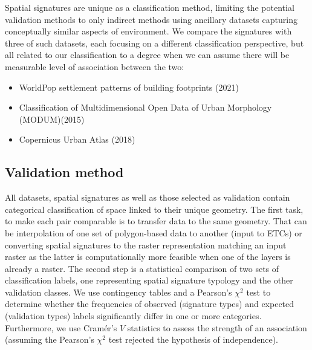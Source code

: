 Spatial signatures are unique as a classification method, limiting the potential
validation methods to only indirect methods using ancillary datasets capturing
conceptually similar aspects of environment. We compare the signatures with three of
such datasets, each focusing on a different classification perspective, but all related
to our classification to a degree when we can assume there will be measurable level of
association between the two:

\begin{itemize}
    \item WorldPop settlement patterns of building footprints (2021)
    \item Classification of Multidimensional Open Data of Urban Morphology (MODUM)(2015)
    \item Copernicus Urban Atlas (2018)
\end{itemize}


\subsection*{Validation method}
All datasets, spatial signatures as well as those selected as validation contain
categorical classification of space linked to their unique geometry. The first task, to
make each pair comparable is to transfer data to the same geometry. That can be
interpolation of one set of polygon-based data to another (input to ETCs) or converting
spatial signatures to the raster representation matching an input raster as the latter
is computationally more feasible when one of the layers is already a raster. The second
step is a statistical comparison of two sets of classification labels, one representing
spatial signature typology and the other validation classes. We use contingency tables
and a Pearson's $\chi^{2}$ test to determine whether the frequencies of observed
(signature types) and expected (validation types) labels significantly differ in one or
more categories. Furthermore, we use Cramér's $V$ statistics to assess the strength of
an association (assuming the Pearson's $\chi^{2}$ test rejected the hypothesis of
independence).

